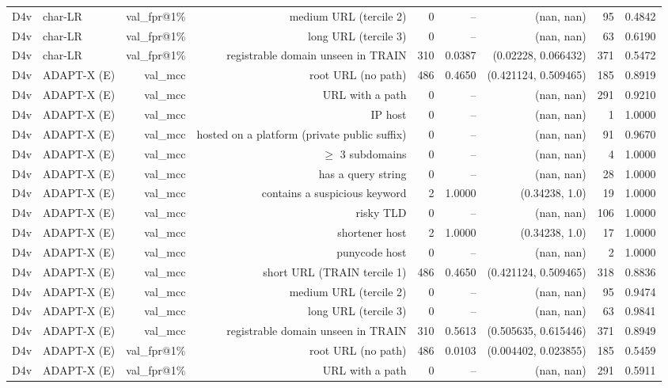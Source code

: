 \begin{table}[t]
\begin{tabular}{llrrrrrrr}
D4v & char-LR & val\_fpr@1\% & medium URL (tercile 2) & 0 & -- & (nan, nan) & 95 & 0.4842 \\
D4v & char-LR & val\_fpr@1\% & long URL (tercile 3) & 0 & -- & (nan, nan) & 63 & 0.6190 \\
D4v & char-LR & val\_fpr@1\% & registrable domain unseen in TRAIN & 310 & 0.0387 & (0.02228, 0.066432) & 371 & 0.5472 \\
D4v & ADAPT-X (E) & val\_mcc & root URL (no path) & 486 & 0.4650 & (0.421124, 0.509465) & 185 & 0.8919 \\
D4v & ADAPT-X (E) & val\_mcc & URL with a path & 0 & -- & (nan, nan) & 291 & 0.9210 \\
D4v & ADAPT-X (E) & val\_mcc & IP host & 0 & -- & (nan, nan) & 1 & 1.0000 \\
D4v & ADAPT-X (E) & val\_mcc & hosted on a platform (private public suffix) & 0 & -- & (nan, nan) & 91 & 0.9670 \\
D4v & ADAPT-X (E) & val\_mcc & $\geq$ 3 subdomains & 0 & -- & (nan, nan) & 4 & 1.0000 \\
D4v & ADAPT-X (E) & val\_mcc & has a query string & 0 & -- & (nan, nan) & 28 & 1.0000 \\
D4v & ADAPT-X (E) & val\_mcc & contains a suspicious keyword & 2 & 1.0000 & (0.34238, 1.0) & 19 & 1.0000 \\
D4v & ADAPT-X (E) & val\_mcc & risky TLD & 0 & -- & (nan, nan) & 106 & 1.0000 \\
D4v & ADAPT-X (E) & val\_mcc & shortener host & 2 & 1.0000 & (0.34238, 1.0) & 17 & 1.0000 \\
D4v & ADAPT-X (E) & val\_mcc & punycode host & 0 & -- & (nan, nan) & 2 & 1.0000 \\
D4v & ADAPT-X (E) & val\_mcc & short URL (TRAIN tercile 1) & 486 & 0.4650 & (0.421124, 0.509465) & 318 & 0.8836 \\
D4v & ADAPT-X (E) & val\_mcc & medium URL (tercile 2) & 0 & -- & (nan, nan) & 95 & 0.9474 \\
D4v & ADAPT-X (E) & val\_mcc & long URL (tercile 3) & 0 & -- & (nan, nan) & 63 & 0.9841 \\
D4v & ADAPT-X (E) & val\_mcc & registrable domain unseen in TRAIN & 310 & 0.5613 & (0.505635, 0.615446) & 371 & 0.8949 \\
D4v & ADAPT-X (E) & val\_fpr@1\% & root URL (no path) & 486 & 0.0103 & (0.004402, 0.023855) & 185 & 0.5459 \\
D4v & ADAPT-X (E) & val\_fpr@1\% & URL with a path & 0 & -- & (nan, nan) & 291 & 0.5911 \\

\end{tabular}
\end{table}
